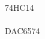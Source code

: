 \documentclass[10pt,a4paper,final]{article}
\begin{document}
\begin{spacing}{1.5}
\pagebreak
\begin{multicols}{3}
74HC14\\
\\
DAC6574\\

\end{multicols}
\end{spacing}
\end{document}
